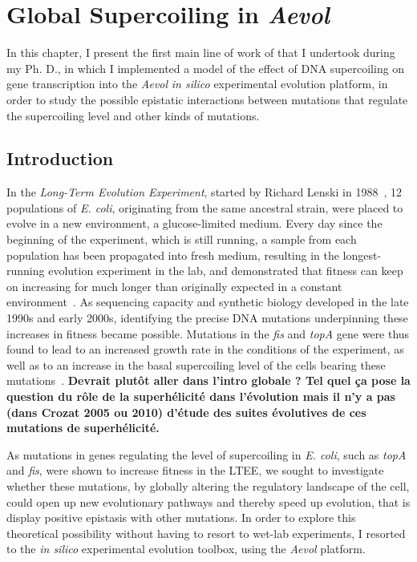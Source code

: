 \chapter{Global Supercoiling in \emph{Aevol}}
\label{chap:aevol}

In this chapter, I present the first main line of work of that I undertook during my Ph. D., in which I implemented a model of the effect of DNA supercoiling on gene transcription into the \emph{Aevol} \emph{in silico} experimental evolution platform, in order to study the possible epistatic interactions between mutations that regulate the supercoiling level and other kinds of mutations.

\section{Introduction}
\label{sec:aevol_intro}

In the \emph{Long-Term Evolution Experiment}, started by Richard Lenski in 1988~\citep{lenski1991}, 12 populations of \emph{E. coli}, originating from the same ancestral strain, were placed to evolve in a new environment, a glucose-limited medium.
Every day since the beginning of the experiment, which is still running, a sample from each population has been propagated into fresh medium, resulting in the longest-running evolution experiment in the lab, and demonstrated that fitness can keep on increasing for much longer than originally expected in a constant environment~\citep{good2017}.
As sequencing capacity and synthetic biology developed in the late 1990s and early 2000s, identifying the precise DNA mutations underpinning these increases in fitness became possible.
Mutations in the \emph{fis} and \emph{topA} gene were thus found to lead to an increased growth rate in the conditions of the experiment, as well as to an increase in the basal supercoiling level of the cells bearing these mutations~\citep{crozat2005}.
\textbf{Devrait plutôt aller dans l'intro globale ?
Tel quel ça pose la question du rôle de la superhélicité dans l'évolution mais il n'y a pas (dans Crozat 2005 ou 2010) d'étude des suites évolutives de ces mutations de superhélicité.}

As mutations in genes regulating the level of supercoiling in \emph{E. coli}, such as \emph{topA} and \emph{fis}, were shown to increase fitness in the LTEE, we sought to investigate whether these mutations, by globally altering the regulatory landscape of the cell, could open up new evolutionary pathways and thereby speed up evolution, that is display positive epistasis with other mutations.
In order to explore this theoretical possibility without having to resort to wet-lab experiments, I resorted to the \emph{in silico} experimental evolution toolbox, using the \emph{Aevol} platform.


